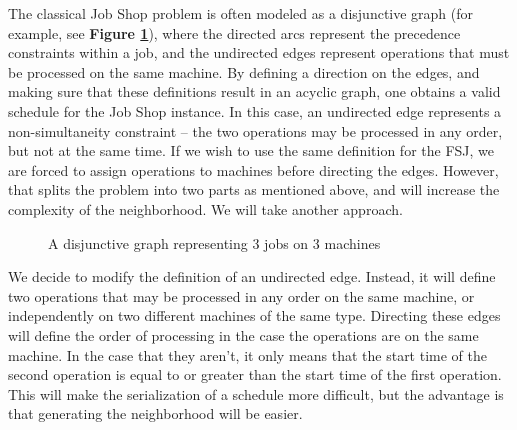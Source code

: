 \documentclass[a4paper,10pt]{article}
\begin{document}
The classical Job Shop problem is often modeled as a disjunctive graph (for example, see \textbf{Figure \ref{fig:disjunctivegraph}}), where the directed arcs represent the precedence constraints within a job, and the undirected edges represent operations that must be processed on the same machine. By defining a direction on the edges, and making sure that these definitions result in an acyclic graph, one obtains a valid schedule for the Job Shop instance. In this case, an undirected edge represents a non-simultaneity constraint -- the two operations may be processed in any order, but not at the same time. If we wish to use the same definition for the FSJ, we are forced to assign operations to machines before directing the edges. However, that splits the problem into two parts as mentioned above, and will increase the complexity of the neighborhood. We will take another approach.

\begin{figure}[h]
\centering
{}
\caption{A disjunctive graph representing 3 jobs on 3 machines}
\label{fig:disjunctivegraph}
\end{figure}

We decide to modify the definition of an undirected edge. Instead, it will define two operations that may be processed in any order on the same machine, or independently on two different machines of the same type. Directing these edges will define the order of processing in the case the operations are on the same machine. In the case that they aren't, it only means that the start time of the second operation is equal to or greater than the start time of the first operation. This will make the serialization of a schedule more difficult, but the advantage is that generating the neighborhood will be easier.
\end{document}
